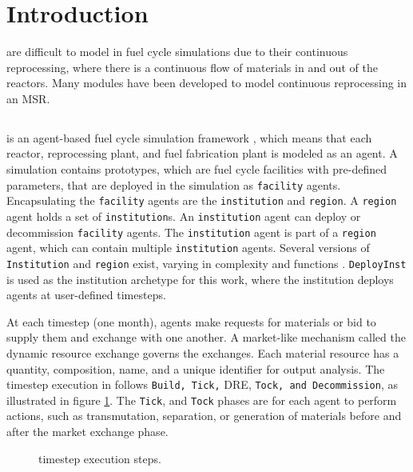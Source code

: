 
\section{Introduction}

 are difficult to model in fuel cycle
simulations due to their continuous reprocessing, where
there is a continuous flow of materials in and out of
the reactors. Many modules have been developed to model
continuous reprocessing in an \gls{MSR}. 



\subsection{\Cyclus}

\Cyclus is an agent-based fuel cycle simulation framework 
\cite{huff_fundamental_2016}, which means 
that each reactor, reprocessing plant, and fuel fabrication plant is modeled as an agent.
A \Cyclus simulation contains prototypes, which are fuel cycle facilities with
pre-defined parameters, that are deployed in the simulation as \texttt{facility} agents.
Encapsulating the \texttt{facility} agents are the \texttt{institution} and \texttt{region}.
A \texttt{region} agent holds a set of \texttt{institution}s.
An \texttt{institution} agent can deploy or decommission \texttt{facility} agents.
The \texttt{institution} agent is part of a \texttt{region} agent,
which can contain multiple \texttt{institution} agents. Several versions of \texttt{Institution}
and \texttt{region} exist, varying in complexity and functions \cite{huff_extensions_2014}.
 \texttt{DeployInst} is used as the institution archetype for this work, where the institution
deploys agents at user-defined timesteps.

At each timestep (one month),
agents make requests for materials or bid to supply them and exchange
with one another. A market-like mechanism called the dynamic resource exchange
\cite{gidden_agent-based_2015} governs the exchanges.
Each material resource has a quantity, composition, name, and a unique identifier
for output analysis. The timestep execution in \Cyclus follows 
\texttt{Build, Tick,} \gls{DRE}, \texttt{Tock, and Decommission}, as illustrated in
figure \ref{fig:time}. The \texttt{Tick}, and \texttt{Tock} phases are for
each agent to perform actions, such as transmutation, separation, or generation
of materials before and after the market exchange phase.

\begin{figure}[h]
\centering
{}
\caption{\Cyclus timestep execution steps.}
\label{fig:time}
\end{figure}

